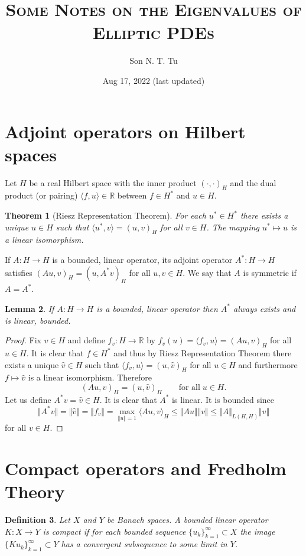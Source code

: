 \documentclass[12pt,oneside,reqno]{amsart}
\title{\textsc{Some Notes on the Eigenvalues of Elliptic PDEs}}
\author{Son N. T. Tu}
\date{Aug 17, 2022 (last updated)}
\newcommand{\R}{\mathbb{R}}
\theoremstyle{plain}
\newtheorem{thm}{Theorem}[section]
\newtheorem{defn}[thm]{Definition}
\newtheorem{lem}[thm]{Lemma}
\theoremstyle{remark}
\begin{document}
\maketitle

\section{Adjoint operators on Hilbert spaces}
Let $H$ be a real Hilbert space with the inner product $(\cdot, \cdot)_H$ and the dual product (or pairing) $\langle f, u\rangle \in \R$ between $f\in H^*$ and $u\in H$. 

\begin{thm}[Riesz Representation Theorem] For each $u^*\in H^*$ there exists a unique $u\in H$ such that $\langle u^*, v\rangle = (u, v)_H$ for all $v\in H$. The mapping $u^*\mapsto u$ is a linear isomorphism.
\end{thm}

If $A: H\to H$ is a bounded, linear operator, its adjoint operator $A^*: H\to H$ satisfies $(Au, v)_H = (u, A^*v)_H$ for all $u,v\in H$. We say that $A$ is symmetric if $A=A^*$.

\begin{lem} If $A: H\to H$ is a bounded, linear operator then $A^*$ always exists and is linear, bounded.
\end{lem}
\begin{proof} Fix $v\in H$ and define $f_v:H\to \R$ by $f_v(u) = \langle f_v, u\rangle = (Au, v)_H$ for all $u\in H$. It is clear that $f\in H^*$ and thus by Riesz Representation Theorem there exists a unique $\hat{v}\in H$ such that $\langle f_v, u\rangle = (u,\hat{v})_H$ for all $u\in H$ and furthermore $f\mapsto \hat{v}$ is a linear isomorphism. Therefore
\begin{equation*}
    (Au, v)_H = (u, \hat{v})_H \qquad
    \text{for all}\;u\in H.
\end{equation*}
Let us define $A^*v = \hat{v} \in H$. It is clear that $A^*$ is linear. It is bounded since 
\begin{equation*}
    \Vert A^* v\Vert = \Vert \hat{v}\Vert  = \Vert f_v\Vert = \max_{\Vert u\Vert = 1} \langle Au, v\rangle_H \leq \Vert Au\Vert \Vert v\Vert \leq \Vert A\Vert_{L(H,H)}\Vert v\Vert
\end{equation*}
for all $v\in H$.
\end{proof}
\section{Compact operators and Fredholm Theory}
\begin{defn}
Let $X$ and $Y$ be Banach spaces. A bounded linear operator $K:X\to Y$ is compact if for each bounded sequence $\{u_k\}_{k=1}^\infty\subset X$ the image $\{Ku_k\}_{k=1}^\infty \subset Y$ has a convergent subsequence to some limit in $Y$. 
\end{defn}
\end{document}

